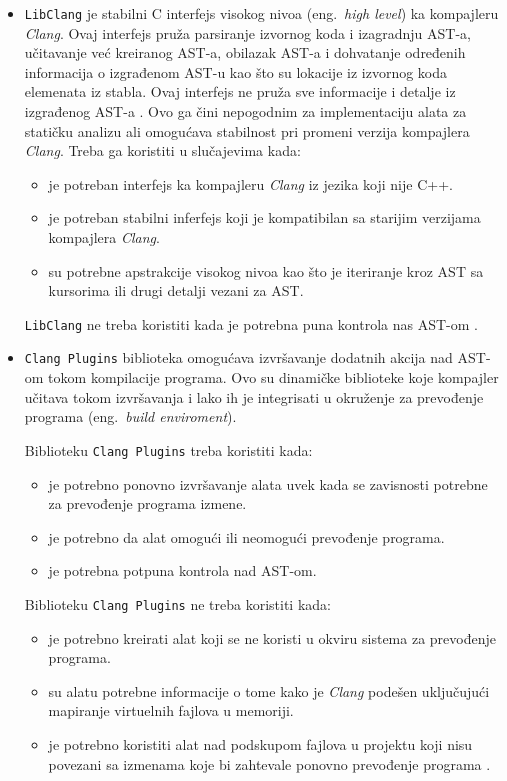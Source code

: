 \documentclass[12pt,oneside]{memoir}
\begin{document}
\begin{itemize}
\item \texttt{LibClang} je stabilni C interfejs visokog nivoa  (eng.~\textit{high level}) ka kompajleru \textit{Clang}. Ovaj interfejs pru\v{z}a parsiranje izvornog koda
i izagradnju AST-a, u\v{c}itavanje ve\'{c} kreiranog AST-a, obilazak AST-a i dohvatanje određenih informacija o izgrađenom AST-u kao \v{s}to su lokacije iz izvornog koda elemenata iz stabla. Ovaj interfejs ne pru\v{z}a sve informacije i detalje iz izgrađenog AST-a \cite{LibClang}. Ovo ga \v{c}ini nepogodnim za implementaciju alata za stati\v{c}ku analizu ali omogu\'{c}ava stabilnost pri promeni verzija kompajlera \textit{Clang}.
Treba ga koristiti u slu\v{c}ajevima kada:
\begin{itemize}
  \item je potreban interfejs ka kompajleru \textit{Clang} iz jezika koji nije C++.
  \item je potreban stabilni inferfejs koji je kompatibilan sa starijim verzijama kompajlera \textit{Clang}.
  \item su potrebne apstrakcije visokog nivoa kao \v{s}to je iteriranje kroz AST sa kursorima ili drugi detalji vezani za AST.
\end{itemize}
\texttt{LibClang} ne treba koristiti kada je potrebna puna kontrola nas AST-om \cite{RightInterface}.

\item \texttt{Clang Plugins} biblioteka omogu\'{c}ava izvr\v{s}avanje dodatnih akcija nad AST-om tokom kompilacije programa. Ovo su dinami\v{c}ke biblioteke koje kompajler u\v{c}itava tokom izvr\v{s}avanja i lako ih je integrisati u okru\v{z}enje za prevođenje programa (eng.~\textit{build enviroment}).

Biblioteku \texttt{Clang Plugins} treba koristiti kada:

\begin{itemize}
\item je potrebno ponovno izvr\v{s}avanje alata uvek kada se zavisnosti potrebne za prevođenje programa izmene.
\item je potrebno da alat omogu\'{c}i ili neomogu\'{c}i prevođenje programa.
\item je potrebna potpuna kontrola nad AST-om.
\end{itemize}
Biblioteku \texttt{Clang Plugins} ne treba koristiti kada:
\begin{itemize}
\item je potrebno kreirati alat koji se ne koristi u okviru sistema za prevođenje programa.
\item su alatu potrebne informacije o tome kako je \textit{Clang} pode\v{s}en uklju\v{c}uju\'{c}i mapiranje virtuelnih fajlova u memoriji.
\item je potrebno koristiti alat nad podskupom fajlova u projektu koji nisu povezani sa izmenama koje bi zahtevale ponovno prevođenje programa \cite{RightInterface}.
\end{itemize}


\end{itemize}
\end{document}
